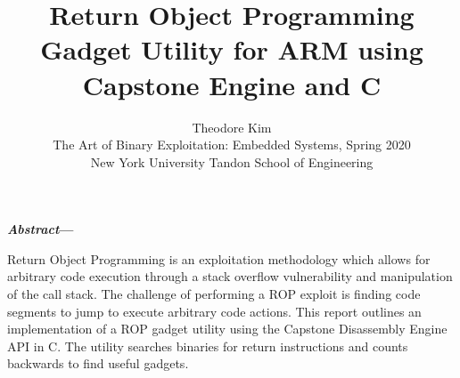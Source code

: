 \documentclass{article}
\date{}
\title{Return Object Programming Gadget Utility for ARM using Capstone Engine and C}
\author{
    Theodore Kim\\
    The Art of Binary Exploitation: Embedded Systems, Spring 2020\\
    New York University Tandon School of Engineering
}
\date{}
\newenvironment{abstractsection}
{%
    \bfseries%
    {\itshape Abstract}---%
    \ignorespaces
}
{\mdseries}
\begin{document}
    \maketitle
    \begin{multicols}{2}
    \begin{abstractsection}
        Return Object Programming is an exploitation methodology which allows for arbitrary code execution through a stack overflow vulnerability and manipulation of the call stack. The challenge of performing a ROP exploit is finding code segments to jump to execute arbitrary code actions. This report outlines an implementation of a ROP gadget utility using the Capstone Disassembly Engine API in C. The utility searches binaries for return instructions and counts backwards to find useful gadgets.
    \end{abstractsection}
    

\end{multicols}
\end{document}
